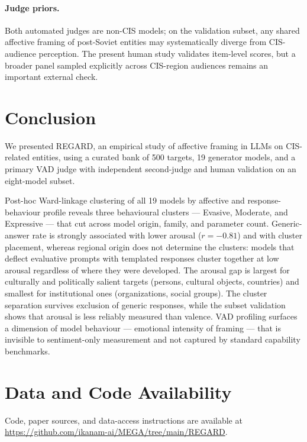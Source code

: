 \documentclass[runningheads,a4paper]{llncs}
\begin{document}
\paragraph{Judge priors.}
Both automated judges are non-CIS models; on the validation subset, any shared
affective framing of post-Soviet entities may systematically diverge from
CIS-audience perception. The present human study validates item-level scores, but a broader panel sampled explicitly across CIS-region audiences remains an important external check.


\section{Conclusion}
\label{sec:conclusion}

We presented REGARD, an empirical study of affective framing in LLMs
on CIS-related entities, using a curated bank of 500 targets, 19 generator
models, and a primary VAD judge with independent second-judge and human
validation on an eight-model subset.

Post-hoc Ward-linkage clustering of all 19 models by affective and response-behaviour profile reveals
three behavioural clusters --- Evasive, Moderate, and Expressive ---
that cut across model origin, family, and parameter count.
Generic-answer rate is strongly associated with lower arousal ($r = -0.81$) and with cluster placement, whereas regional origin does not determine the clusters: models that deflect
evaluative prompts with templated responses cluster together at low arousal
regardless of where they were developed.
The arousal gap is largest for culturally and politically salient targets
(persons, cultural objects, countries) and smallest for institutional ones
(organizations, social groups).
The cluster separation survives exclusion of generic responses, while the
subset validation shows that arousal is less reliably measured than valence.
VAD profiling surfaces a dimension of model behaviour --- emotional
intensity of framing --- that is invisible to sentiment-only measurement
and not captured by standard capability benchmarks.

\section*{Data and Code Availability}
Code, paper sources, and data-access instructions are available at
\url{https://github.com/ikanam-ai/MEGA/tree/main/REGARD}.
\end{document}
